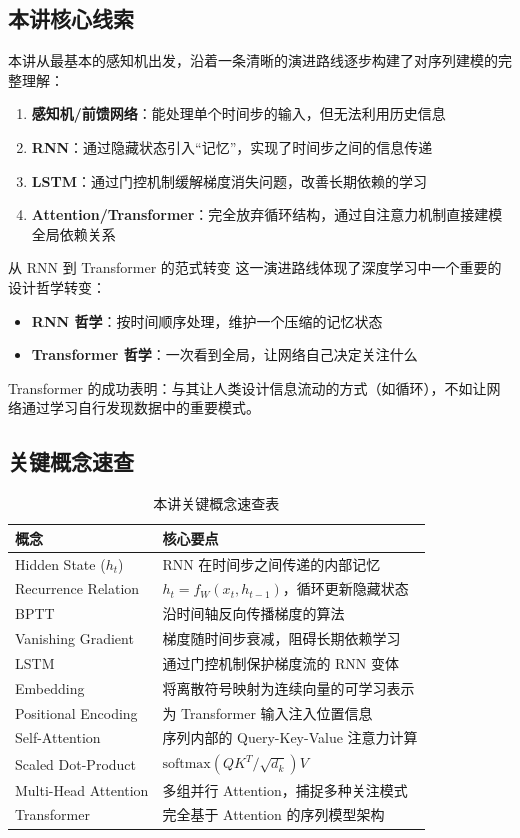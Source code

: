 \documentclass[a4paper]{article}
\begin{document}
\subsection{本讲核心线索}

本讲从最基本的感知机出发，沿着一条清晰的演进路线逐步构建了对序列建模的完整理解：

\begin{enumerate}
    \item \textbf{感知机/前馈网络}：能处理单个时间步的输入，但无法利用历史信息
    \item \textbf{RNN}：通过隐藏状态引入``记忆''，实现了时间步之间的信息传递
    \item \textbf{LSTM}：通过门控机制缓解梯度消失问题，改善长期依赖的学习
    \item \textbf{Attention/Transformer}：完全放弃循环结构，通过自注意力机制直接建模全局依赖关系
\end{enumerate}

\begin{importantbox}{从 RNN 到 Transformer 的范式转变}
这一演进路线体现了深度学习中一个重要的设计哲学转变：
\begin{itemize}
    \item \textbf{RNN 哲学}：按时间顺序处理，维护一个压缩的记忆状态
    \item \textbf{Transformer 哲学}：一次看到全局，让网络自己决定关注什么
\end{itemize}
Transformer 的成功表明：与其让人类设计信息流动的方式（如循环），不如让网络通过学习自行发现数据中的重要模式。
\end{importantbox}

\subsection{关键概念速查}

\begin{table}[H]
\centering
\caption{本讲关键概念速查表}
\begin{tabular}{ll}
\toprule
\textbf{概念} & \textbf{核心要点} \\
\midrule
Hidden State ($h_t$) & RNN 在时间步之间传递的内部记忆 \\
Recurrence Relation & $h_t = f_W(x_t, h_{t-1})$，循环更新隐藏状态 \\
BPTT & 沿时间轴反向传播梯度的算法 \\
Vanishing Gradient & 梯度随时间步衰减，阻碍长期依赖学习 \\
LSTM & 通过门控机制保护梯度流的 RNN 变体 \\
Embedding & 将离散符号映射为连续向量的可学习表示 \\
Positional Encoding & 为 Transformer 输入注入位置信息 \\
Self-Attention & 序列内部的 Query-Key-Value 注意力计算 \\
Scaled Dot-Product & $\text{softmax}(QK^T/\sqrt{d_k})V$ \\
Multi-Head Attention & 多组并行 Attention，捕捉多种关注模式 \\
Transformer & 完全基于 Attention 的序列模型架构 \\
\bottomrule
\end{tabular}
\end{table}
\end{document}
